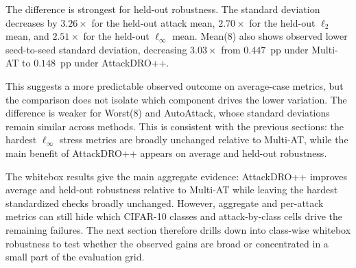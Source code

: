 The difference is strongest for held-out robustness. The standard deviation decreases by
\(3.26\times\) for the held-out attack mean, \(2.70\times\) for the held-out \(\ell_2\) mean, and
\(2.51\times\) for the held-out \(\ell_\infty\) mean. Mean(8) also shows
observed lower seed-to-seed standard deviation, decreasing \(3.03\times\) from \(0.447\)~pp
under Multi-AT to \(0.148\)~pp under AttackDRO++.

This suggests a more predictable observed outcome on average-case metrics, but
the comparison does not isolate which component drives the lower variation. The
difference is weaker for Worst(8) and AutoAttack, whose standard deviations
remain similar across methods. This is consistent with the previous sections:
the hardest \(\ell_\infty\) stress metrics are broadly unchanged relative to
Multi-AT, while the main benefit of AttackDRO++ appears on average and held-out
robustness.

The whitebox results give the main aggregate evidence: AttackDRO++ improves
average and held-out robustness relative to Multi-AT while leaving the hardest
standardized checks broadly unchanged. However, aggregate and per-attack metrics can still hide
which CIFAR-10 classes and attack-by-class cells drive the remaining failures. The
next section therefore drills down into class-wise whitebox robustness to test
whether the observed gains are broad or concentrated in a small part of the
evaluation grid.
